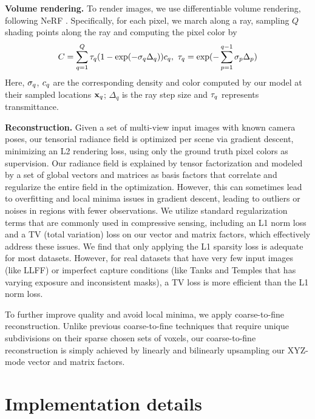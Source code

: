 \documentclass[runningheads]{llncs}
\newcommand{\boldstartspace}[1]{\vspace{0.1in}\noindent\textbf{#1}}
\begin{document}
\boldstartspace{Volume rendering.} 
To render images, we use differentiable volume rendering, following NeRF \cite{mildenhall2020nerf}. Specifically, for each pixel, we march along a ray, sampling $Q$ shading points along the ray and computing the pixel color by
\begin{equation}
        \Color =  \sum_{q=1}^Q \Trans_q (1-\exp (-\Dens_q \Step_q)) \Rad_q, \ 
        \Trans_q = \exp (-\sum_{p=1}^{q-1} \Dens_p \Step_p )
    \label{eq:raymarching}
\end{equation}
Here, $\sigma_q$, $c_q$ are the corresponding density and color computed by our model at their sampled locations $\mathbf{x}_q$; $\Delta_q$ is the ray step size and $\tau_q$ represents transmittance. 

\boldstartspace{Reconstruction.}
Given a set of multi-view input images with known camera poses, our tensorial radiance field is optimized per scene via gradient descent, minimizing an L2 rendering loss, using only the ground truth pixel colors as supervision.
Our radiance field is explained by tensor factorization and modeled by a set of global vectors and matrices as basis factors that correlate and regularize the entire field in the optimization.
However, this can sometimes lead to overfitting and local minima issues in gradient descent,
leading to outliers or noises in regions with fewer observations.
We utilize standard regularization terms that are commonly used in compressive sensing, including an L1 norm loss and a TV (total variation) loss on our vector and matrix factors, which effectively address these issues.
We find that only applying the L1 sparsity loss is adequate for most datasets. However, for real datasets that have very few input images (like LLFF\cite{llff}) or imperfect capture conditions (like Tanks and Temples \cite{Knapitsch2017,liu2020neural} that has varying exposure and inconsistent masks), a TV loss is more efficient than the L1 norm loss.




To further improve quality and avoid local minima, we apply coarse-to-fine reconstruction. Unlike previous coarse-to-fine techniques that require unique subdivisions on their sparse chosen sets of voxels, our coarse-to-fine reconstruction is simply achieved by linearly and bilinearly upsampling our XYZ-mode vector and matrix factors.
 
\section{Implementation details}
\end{document}
